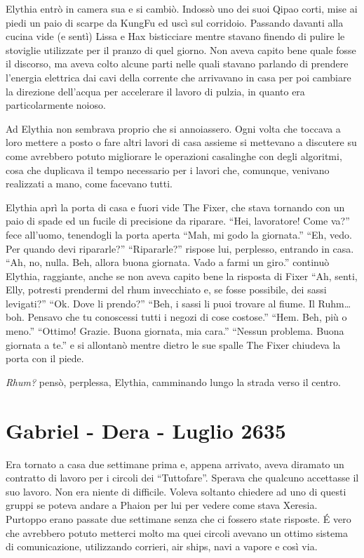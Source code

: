     Elythia entrò in camera sua e si cambiò. Indossò uno dei suoi Qipao
    corti, mise ai piedi un paio di scarpe da KungFu ed uscì sul corridoio.
    Passando davanti alla cucina vide (e sentì) Lissa e Hax bisticciare mentre
    stavano finendo di pulire le stoviglie utilizzate per il pranzo di quel
    giorno. Non aveva capito bene quale fosse il discorso, ma aveva colto
    alcune parti nelle quali stavano parlando di prendere l'energia
    elettrica dai cavi della corrente che arrivavano in casa per poi
    cambiare la direzione dell'acqua per accelerare il lavoro di pulzia, in
    quanto era particolarmente noioso.

    Ad Elythia non sembrava proprio che si annoiassero. Ogni volta che
    toccava a loro mettere a posto o fare altri lavori di casa assieme si
    mettevano a discutere su come avrebbero potuto migliorare le operazioni
    casalinghe con degli algoritmi, cosa che duplicava il tempo necessario
    per i lavori che, comunque, venivano realizzati a mano, come facevano
    tutti.

    Elythia aprì la porta di casa e fuori vide The Fixer, che stava
    tornando con un paio di spade ed un fucile di precisione da riparare.
    ``Hei, lavoratore! Come va?'' fece all'uomo, tenendogli la porta aperta
    ``Mah, mi godo la giornata.'' ``Eh, vedo. Per quando devi ripararle?''
    ``Ripararle?'' rispose lui, perplesso, entrando in casa. ``Ah, no,
    nulla. Beh, allora buona giornata. Vado a farmi un giro.'' continuò
    Elythia, raggiante, anche se non aveva capito bene la risposta di Fixer
    ``Ah, senti, Elly, potresti prendermi del rhum invecchiato e, se fosse
    possibile, dei sassi levigati?'' ``Ok. Dove li prendo?'' ``Beh, i sassi
    li puoi trovare al fiume. Il Ruhm\dots{} boh. Pensavo che tu conoscessi
    tutti i negozi di cose costose.'' ``Hem. Beh, più o meno.'' ``Ottimo!
    Grazie. Buona giornata, mia cara.'' ``Nessun problema. Buona giornata a
    te.'' e si allontanò mentre dietro le sue spalle The Fixer chiudeva la
    porta con il piede.

    \emph{Rhum?} pensò, perplessa, Elythia, camminando lungo la strada
    verso il centro.

  \section{Gabriel - Dera - Luglio 2635}
    
    Era tornato a casa due settimane prima e, appena arrivato, aveva
    diramato un contratto di lavoro per i circoli dei ``Tuttofare''.
    Sperava che qualcuno accettasse il suo lavoro. Non era niente di
    difficile. Voleva soltanto chiedere ad uno di questi gruppi se poteva
    andare a Phaion per lui per vedere come stava Xeresia. Purtoppo erano
    passate due settimane senza che ci fossero state risposte. \'E vero che
    avrebbero potuto metterci molto ma quei circoli avevano un ottimo
    sistema di comunicazione, utilizzando corrieri, air ships, navi a
    vapore e così via.

